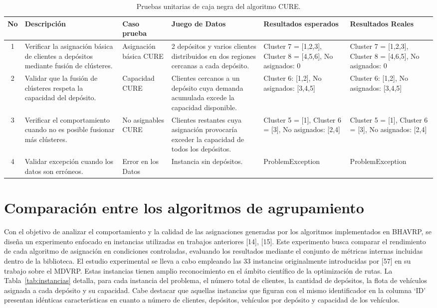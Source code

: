 \begin{table}[H]
\centering
\caption{Pruebas unitarias de caja negra del algoritmo CURE.}
\label{tab:pruebas_cure}
\footnotesize
\begin{tabular}{@{}cp{2.6cm}p{2.2cm}p{3cm}p{3cm}p{3cm}@{}}
\toprule
\textbf{No} & \textbf{Descripci\'on} & \textbf{Caso prueba} & \textbf{Juego de Datos} & \textbf{Resultados esperados} & \textbf{Resultados Reales} \\
\midrule
1 & Verificar la asignaci\'on b\'asica de clientes a dep\'ositos mediante fusi\'on de cl\'usteres. & Asignaci\'on b\'asica CURE & 2 dep\'ositos y varios clientes distribuidos en dos regiones cercanas a cada dep\'osito. & Cluster 7 = [1,2,3], Cluster 8 = [4,5,6], No asignados: 0 & Cluster 7 = [1,2,3], Cluster 8 = [4,6,5], No asignados: 0 \\
2 & Validar que la fusi\'on de cl\'usteres respeta la capacidad del dep\'osito. & Capacidad CURE & Clientes cercanos a un dep\'osito cuya demanda acumulada excede la capacidad disponible. & Cluster 6: [1,2], No asignados: [3,4,5] & Cluster 6: [1,2], No asignados: [3,4,5] \\
3 & Verificar el comportamiento cuando no es posible fusionar m\'as cl\'usteres. & No asignables CURE & Clientes restantes cuya asignaci\'on provocar\'ia exceder la capacidad de todos los dep\'ositos. & Cluster 5 = [1], Cluster 6 = [3], No asignados: [2,4] & Cluster 5 = [1], Cluster 6 = [3], No asignados: [2,4] \\
4 & Validar excepci\'on cuando los datos son err\'oneos. & Error en los Datos & Instancia sin dep\'ositos. & ProblemException & ProblemException \\
\bottomrule
\end{tabular}
\end{table}

\section{Comparaci\'on entre los algoritmos de agrupamiento}

Con el objetivo de analizar el comportamiento y la calidad de las asignaciones generadas por los algoritmos implementados en BHAVRP, se dise\~na un experimento enfocado en instancias utilizadas en trabajos anteriores [14], [15]. Este experimento busca comparar el rendimiento de cada algoritmo de asignaci\'on en condiciones controladas, evaluando los resultados mediante el conjunto de m\'etricas internas incluidas dentro de la biblioteca. El estudio experimental se lleva a cabo empleando las 33 instancias originalmente introducidas por [57] en su trabajo sobre el MDVRP. Estas instancias tienen amplio reconocimiento en el \'ambito cient\'ifico de la optimizaci\'on de rutas. La Tabla~\ref{tab:instancias} detalla, para cada instancia del problema, el n\'umero total de clientes, la cantidad de dep\'ositos, la flota de veh\'iculos asignada a cada dep\'osito y su capacidad. Cabe destacar que aquellas instancias que figuran con el mismo identificador en la columna `ID' presentan id\'enticas caracter\'isticas en cuanto a n\'umero de clientes, dep\'ositos, veh\'iculos por dep\'osito y capacidad de los veh\'iculos.

